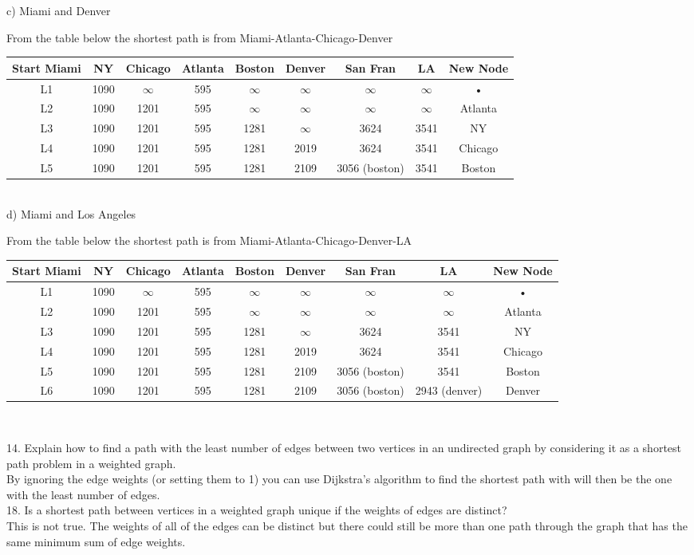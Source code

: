 \documentclass{article}
\begin{document}
c) Miami and Denver

From the table below the shortest path is from Miami-Atlanta-Chicago-Denver


\begin{tabular}{|c|c|c|c|c|c|c|c|c|}
\hline 
Start Miami & NY & Chicago & Atlanta & Boston & Denver & San Fran & LA & New Node \\ 
\hline 
L1 & 1090 & $\infty$ & 595 & $\infty$ & $\infty$ & $\infty$ & $\infty$ & • \\ 
\hline 
L2 & 1090 & 1201 & 595  & $\infty$ & $\infty$ & $\infty$ & $\infty$ & Atlanta \\ 
\hline
L3 & 1090 & 1201 & 595  & 1281 & $\infty$ &
3624 & 3541 & NY \\ 
\hline
L4 & 1090 & 1201 & 595  & 1281 & 2019 &
3624 & 3541 & Chicago \\ 
\hline
L5 & 1090 & 1201 & 595  & 1281 & 2109 &
3056 (boston) & 3541 & Boston \\ 
\hline
\end{tabular} \\


d) Miami and Los Angeles

From the table below the shortest path is from Miami-Atlanta-Chicago-Denver-LA

\begin{tabular}{|c|c|c|c|c|c|c|c|c|}
\hline 
Start Miami & NY & Chicago & Atlanta & Boston & Denver & San Fran & LA & New Node \\ 
\hline 
L1 & 1090 & $\infty$ & 595 & $\infty$ & $\infty$ & $\infty$ & $\infty$ & • \\ 
\hline 
L2 & 1090 & 1201 & 595  & $\infty$ & $\infty$ & $\infty$ & $\infty$ & Atlanta \\ 
\hline
L3 & 1090 & 1201 & 595  & 1281 & $\infty$ &
3624 & 3541 & NY \\ 
\hline
L4 & 1090 & 1201 & 595  & 1281 & 2019 &
3624 & 3541 & Chicago \\ 
\hline
L5 & 1090 & 1201 & 595  & 1281 & 2109 &
3056 (boston) & 3541 & Boston \\ 
\hline
L6 & 1090 & 1201 & 595  & 1281 & 2109 &
3056 (boston) & 2943 (denver) & Denver \\ 
\hline
\end{tabular} \\

\newpage

14. Explain how to find a path with the least number of edges between two vertices in an
undirected graph by considering it as a shortest path problem in
a weighted graph.\\

By ignoring the edge weights (or setting them to 1) you can use Dijkstra's algorithm to find the shortest path with will then be the one with the least number of edges. \\

18. Is a shortest path between vertices in a weighted graph unique if the weights of edges
are distinct?\\

This is not true.  The weights of all of the edges can be distinct but there could still be more than one path through the graph that has the same minimum sum of edge weights. 
\end{document}
